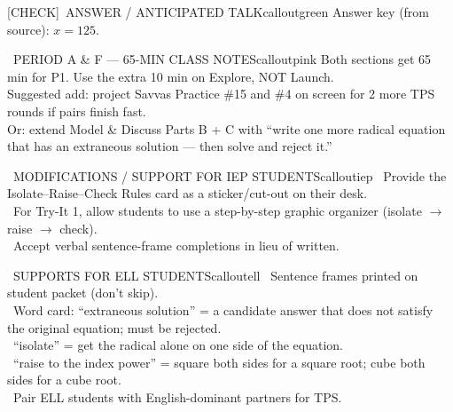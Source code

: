 \documentclass[11pt]{article}
\newcommand{\IconCheck}{[CHECK]}
\newcommand{\teacheranswerbox}[1]{%
  \begin{callout}{\IconCheck\ ANSWER / ANTICIPATED TALK}{calloutgreen}
  \small #1
  \end{callout}
}
\begin{document}

\teacheranswerbox{Answer key (from source): \(x=125\).}

\clearpage

\begin{callout}{\IconClock\ PERIOD A \& F --- 65-MIN CLASS NOTES}{calloutpink}
Both sections get 65 min for P1. Use the extra 10 min on Explore, NOT Launch.\\
Suggested add: project Savvas Practice \#15 and \#4 on screen for 2 more TPS rounds if pairs finish fast.\\
Or: extend Model \& Discuss Parts B + C with ``write one more radical equation that has an extraneous solution --- then solve and reject it.''
\end{callout}

\begin{callout}{\IconPuzzle\ MODIFICATIONS / SUPPORT FOR IEP STUDENTS}{calloutiep}
\textbullet\ Provide the Isolate--Raise--Check Rules card as a sticker/cut-out on their desk.\\
\textbullet\ For Try-It 1, allow students to use a step-by-step graphic organizer (isolate \(\rightarrow\) raise \(\rightarrow\) check).\\
\textbullet\ Accept verbal sentence-frame completions in lieu of written.
\end{callout}

\begin{callout}{\IconGlobe\ SUPPORTS FOR ELL STUDENTS}{calloutell}
\textbullet\ Sentence frames printed on student packet (don't skip).\\
\textbullet\ Word card: ``extraneous solution'' = a candidate answer that does not satisfy the original equation; must be rejected.\\
\textbullet\ ``isolate'' = get the radical alone on one side of the equation.\\
\textbullet\ ``raise to the index power'' = square both sides for a square root; cube both sides for a cube root.\\
\textbullet\ Pair ELL students with English-dominant partners for TPS.
\end{callout}
\end{document}
